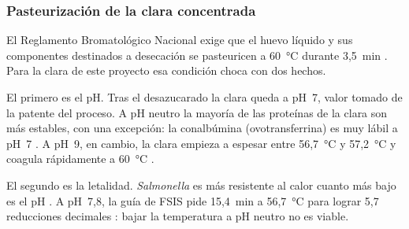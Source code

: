 
\subsubsection{Pasteurización de la clara concentrada}

El Reglamento Bromatológico Nacional exige que el huevo líquido y sus componentes
destinados a desecación se pasteuricen a 60~°C durante 3,5~min
\parencite[art.~15.2.11]{rbn1994cap15}. Para la clara de este proyecto esa condición
choca con dos hechos.

El primero es el pH. Tras el desazucarado la clara queda a pH~7, valor tomado de la
patente del proceso. A pH neutro la mayoría de las proteínas de la clara son más
estables, con una excepción: la conalbúmina (ovotransferrina) es muy lábil a pH~7
\parencite[p.~298]{cunningham1995pasteurization}. A pH~9, en cambio, la clara empieza a
espesar entre 56,7~°C y 57,2~°C y coagula rápidamente a
60~°C \parencite[pp.~290--291]{cunningham1995pasteurization}.

El segundo es la letalidad. \textit{Salmonella} es más resistente al calor cuanto más
bajo es el pH \parencite[p.~292]{cunningham1995pasteurization}. A pH~7,8, la guía de FSIS
pide 15,4~min a 56,7~°C para lograr 5,7 reducciones decimales
\parencite[Tabla~III.A]{fsis2026guideline}: bajar la temperatura a pH neutro no es viable.

